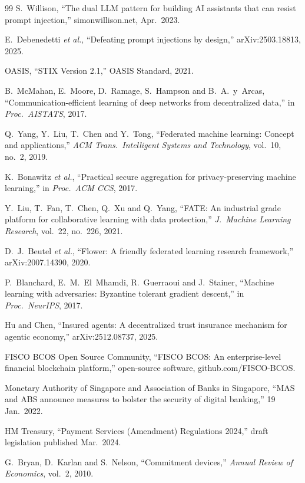 \documentclass[10pt,a4paper,twocolumn]{article}
\begin{document}
\begin{thebibliography}{99}
 S.~Willison, ``The dual LLM pattern for building AI assistants that
can resist prompt injection,'' simonwillison.net, Apr.\ 2023.

 E.~Debenedetti \emph{et al.}, ``Defeating prompt injections by design,''
arXiv:2503.18813, 2025.

 OASIS, ``STIX Version 2.1,'' OASIS Standard, 2021.

 B.~McMahan, E.~Moore, D.~Ramage, S.~Hampson and B.~A.~y~Arcas,
``Communication-efficient learning of deep networks from decentralized data,'' in
\emph{Proc.\ AISTATS}, 2017.

 Q.~Yang, Y.~Liu, T.~Chen and Y.~Tong, ``Federated machine learning:
Concept and applications,'' \emph{ACM Trans.\ Intelligent Systems and Technology},
vol.~10, no.~2, 2019.

 K.~Bonawitz \emph{et al.}, ``Practical secure aggregation for
privacy-preserving machine learning,'' in \emph{Proc.\ ACM CCS}, 2017.

 Y.~Liu, T.~Fan, T.~Chen, Q.~Xu and Q.~Yang, ``FATE: An industrial grade
platform for collaborative learning with data protection,'' \emph{J.\ Machine Learning
Research}, vol.~22, no.~226, 2021.

 D.~J.~Beutel \emph{et al.}, ``Flower: A friendly federated learning
research framework,'' arXiv:2007.14390, 2020.

 P.~Blanchard, E.~M.~El~Mhamdi, R.~Guerraoui and J.~Stainer, ``Machine
learning with adversaries: Byzantine tolerant gradient descent,'' in \emph{Proc.\
NeurIPS}, 2017.

 Hu and Chen, ``Insured agents: A decentralized trust insurance
mechanism for agentic economy,'' arXiv:2512.08737, 2025.

 FISCO BCOS Open Source Community, ``FISCO BCOS: An enterprise-level
financial blockchain platform,'' open-source software, github.com/FISCO-BCOS.

 Monetary Authority of Singapore and Association of Banks in Singapore,
``MAS and ABS announce measures to bolster the security of digital banking,'' 19 Jan.\
2022.

 HM Treasury, ``Payment Services (Amendment) Regulations 2024,'' draft
legislation published Mar.\ 2024.

 G.~Bryan, D.~Karlan and S.~Nelson, ``Commitment devices,''
\emph{Annual Review of Economics}, vol.~2, 2010.

\end{thebibliography}
\end{document}
